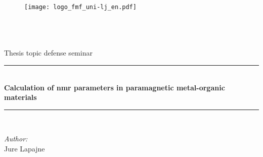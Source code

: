\begin{titlepage}

\begin{figure}[t]
    \centering
    \texttt{[image: logo\_fmf\_uni-lj\_en.pdf]}
\end{figure}    

\newcommand{\HRule}{\rule{\linewidth}{0.5mm}} %

\center %
 

\textsc{\LARGE }\\[0cm] %
\textsc{\Large }\\[0cm] %
\textsc{\large }\\[0cm] Thesis topic defense seminar    %


\HRule \\[0.4cm]
{ \huge \bfseries Calculation of nmr parameters in paramagnetic metal-organic materials}\\[0.4cm] %
\HRule \\[1.5cm]
 

\begin{minipage}{0.4\textwidth}
  \begin{flushleft} \large
   \raggedright
\emph{Author:}\\
Jure Lapajne \textsc{} %
\end{flushleft}
\end{minipage}
~
\begin{minipage}{0.45\textwidth}
  \begin{flushright} \large
    \raggedright
\emph{} \\

\end{flushright}
\end{minipage}\\[4cm]


\end{titlepage}
